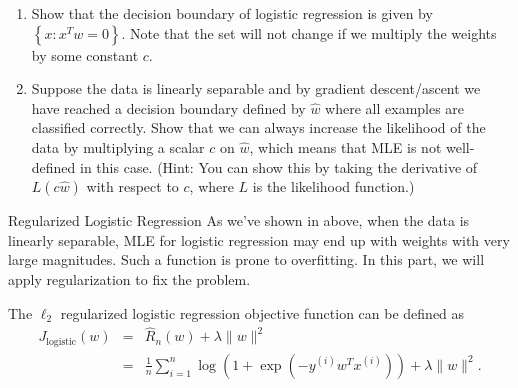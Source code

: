 \documentclass{article}
\newcommand{\sol}[1]{\textcolor{gray}{Solution: #1}}
\newcommand{\nyuparagraph}[1]{\textcolor{nyupurple}{\large #1}}
\theoremstyle{plain}
\theoremstyle{definition}
\begin{document}
\begin{enumerate}
  \setcounter{enumi}{\value{saveenum}}
\item Show that the decision boundary of logistic regression is given by $\left\{x\colon x^Tw=0\right\}$.
Note that the set will not change if we multiply the weights by some constant $c$.
\item Suppose the data is linearly separable and by gradient descent/ascent we have reached a decision boundary defined by $\hat{w}$ where all examples are classified correctly. 
Show that we can always increase the likelihood of the data by multiplying a scalar $c$ on $\hat{w}$,
which means that MLE is not well-defined in this case.
{(Hint: You can show this by taking the derivative of $L(c\hat{w})$ with respect to $c$, where $L$ is the likelihood function.)}

\setcounter{saveenum}{\value{enumi}}
\end{enumerate}

\nyuparagraph{\label{subsec:Regularized-Logistic-Regression}Regularized Logistic
Regression}
As we've shown in above, when the data is linearly separable,
MLE for logistic regression may end up with weights with very large magnitudes. Such a function is prone to overfitting.
In this part, we will apply regularization to fix the problem.

The $\ell_2$ regularized
logistic regression objective function can be defined as
\begin{eqnarray*}
J_{\text{logistic}}(w) & = & \hat{R}_{n}(w)+\lambda\|w\|^{2}\\
 & = & \frac{1}{n}\sum_{i=1}^{n}\log\left(1+\exp\left(-y^{(i)}w^{T}x^{(i)}\right)\right)+\lambda\|w\|^{2}.
\end{eqnarray*}
 
\end{document}
